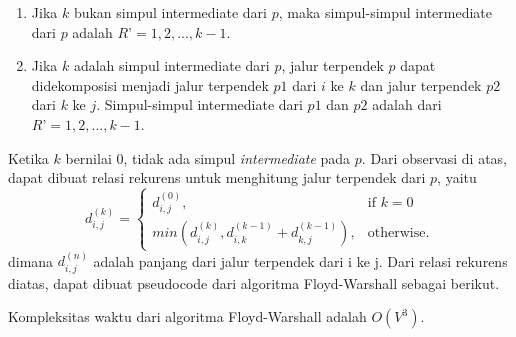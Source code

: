         \begin{enumerate}
            \item Jika $k$ bukan simpul intermediate dari $p$, maka simpul-simpul intermediate dari $p$ adalah $R’ = {1, 2, ..., k-1}$.
            \item Jika $k$ adalah simpul intermediate dari $p$, jalur terpendek $p$ dapat didekomposisi menjadi jalur terpendek $p1$ dari $i$ ke $k$ 
            dan jalur terpendek $p2$ dari $k$ ke $j$. Simpul-simpul intermediate dari $p1$ dan $p2$ adalah dari $R’ = {1, 2, ..., k-1}$.
        \end{enumerate}

        Ketika $k$ bernilai 0, tidak ada simpul \textit{intermediate} pada $p$. Dari observasi di atas, dapat dibuat relasi rekurens untuk menghitung jalur terpendek dari $p$, yaitu
        \begin{equation}
            d_{i,j}^{(k)} =
            \begin{cases}
                d_{i,j}^{(0)}, & \text{if } k = 0\\
                min(d_{i,j}^{(k)}, d_{i,k}^{(k-1)} + d_{k,j}^{(k-1)}), & \text{otherwise}.
            \end{cases}
        \end{equation}
        dimana $d_{i,j}^{(n)}$ adalah panjang dari jalur terpendek dari i ke j. Dari relasi rekurens diatas, dapat dibuat pseudocode dari algoritma Floyd-Warshall sebagai berikut.

        \medskip
        

        Kompleksitas waktu dari algoritma Floyd-Warshall adalah $O(V^{3})$.

